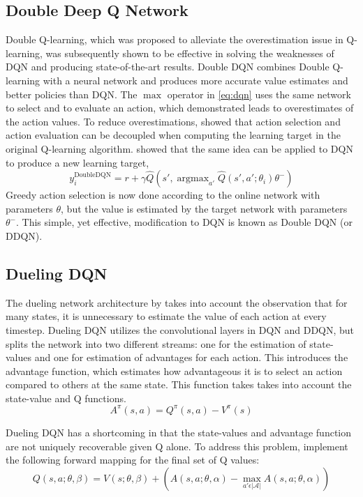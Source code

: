 \documentclass{article}
\DeclareMathOperator*{\argmax}{argmax}
\begin{document}
\subsection{Double Deep Q Network}
Double Q-learning, which was proposed to alleviate the overestimation issue in
Q-learning, was subsequently shown to be effective in solving the weaknesses of
DQN and producing state-of-the-art results.  Double DQN combines Double
Q-learning with a neural network and produces more accurate value estimates and
better policies than DQN.  The $\max$ operator in \eqref{eq:dqn} uses the same
network to select and to evaluate an action, which \cite{van2016deep}
demonstrated leads to overestimates of the action values. To reduce
overestimations, \cite{hasselt2010double} showed that action selection and
action evaluation can be decoupled when computing the learning target in the
original Q-learning algorithm. \cite{van2016deep} showed that the same idea can
be applied to DQN to produce a new learning target,
\begin{equation}
    y_i^{\text{DoubleDQN}} = r + \gamma \hat{Q}(s', \argmax_{a'}
    \hat{Q}(s',a';\theta_i) \theta^-)
\end{equation}
Greedy action selection is now done according to the online network with
parameters $\theta$, but the value is estimated by the target network with
parameters $\theta^-$.  This simple, yet effective, modification to DQN is known
as Double DQN (or DDQN). 

\subsection{Dueling DQN}
The dueling network architecture by \cite{wang2016dueling} takes into account
the observation that for many states, it is unnecessary to estimate the value of
each action at every timestep. Dueling DQN utilizes the convolutional layers in
DQN and DDQN, but splits the network into two different streams: one for the
estimation of state-values and one for estimation of advantages for each action.
This introduces the advantage function, which estimates how advantageous it is
to select an action compared to others at the same state. This function takes
takes into account the state-value and Q functions.
\begin{equation}
    A^{\pi}(s, a) = Q^{\pi}(s,a) - V^{\pi}(s)
\end{equation}

Dueling DQN has a shortcoming in that the state-values and advantage function
are not uniquely recoverable given Q alone. To address this problem,
\cite{wang2016dueling} implement the following forward mapping for the final
set of Q values:
\begin{equation}
    Q(s,a; \theta, \beta)  = V(s; \theta, \beta) + (A(s, a; \theta, \alpha) - 
    \max_{a' \epsilon \vert \mathcal{A} \vert} A(s, a; \theta, \alpha))
\end{equation}
\end{document}
